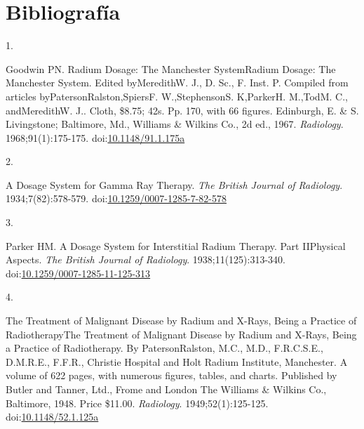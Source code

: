 \documentclass[
  a4paper,
]{scrreprt}
\newlength{\cslhangindent}
\newlength{\csllabelwidth}
\newlength{\cslentryspacingunit} %
\newenvironment{CSLReferences}[2] %
 {%
  \setlength{\parindent}{0pt}
  \ifodd #1
  \let\oldpar\par
  \def\par{\hangindent=\cslhangindent\oldpar}
  \fi
  \setlength{\parskip}{#2\cslentryspacingunit}
 }%
 {}
\newcommand{\CSLLeftMargin}[1]{\parbox[t]{\csllabelwidth}{#1}}
\newcommand{\CSLRightInline}[1]{\parbox[t]{\linewidth - \csllabelwidth}{#1}\break}
\begin{document}

\hypertarget{bibliografuxeda}{%
\chapter*{Bibliografía}\label{bibliografuxeda}}


\hypertarget{refs}{}
\begin{CSLReferences}{0}{0}
\leavevmode{}%
\CSLLeftMargin{1. }%
\CSLRightInline{Goodwin PN. Radium Dosage: The Manchester SystemRadium
Dosage: The Manchester System. Edited byMeredithW. J., D. Sc., F. Inst.
P. Compiled from articles byPatersonRalston,SpiersF. W.,StephensonS.
K,ParkerH. M.,TodM. C., andMeredithW. J.. Cloth, {\$}8.75; 42s. Pp. 170,
with 66 figures. Edinburgh, E. \& S. Livingstone; Baltimore, Md.,
Williams \& Wilkins Co., 2d ed., 1967. \emph{Radiology}.
1968;91(1):175-175.
doi:\href{https://doi.org/10.1148/91.1.175a}{10.1148/91.1.175a}}

\leavevmode{}%
\CSLLeftMargin{2. }%
\CSLRightInline{A Dosage System for Gamma Ray Therapy. \emph{The British
Journal of Radiology}. 1934;7(82):578-579.
doi:\href{https://doi.org/10.1259/0007-1285-7-82-578}{10.1259/0007-1285-7-82-578}}

\leavevmode{}%
\CSLLeftMargin{3. }%
\CSLRightInline{Parker HM. A Dosage System for Interstitial Radium
Therapy. Part II{\textemdash}Physical Aspects. \emph{The British Journal
of Radiology}. 1938;11(125):313-340.
doi:\href{https://doi.org/10.1259/0007-1285-11-125-313}{10.1259/0007-1285-11-125-313}}

\leavevmode{}%
\CSLLeftMargin{4. }%
\CSLRightInline{The Treatment of Malignant Disease by Radium and X-Rays,
Being a Practice of RadiotherapyThe Treatment of Malignant Disease by
Radium and X-Rays, Being a Practice of Radiotherapy. By PatersonRalston,
M.C., M.D., F.R.C.S.E., D.M.R.E., F.F.R., Christie Hospital and Holt
Radium Institute, Manchester. A volume of 622 pages, with numerous
figures, tables, and charts. Published by Butler and Tanner, Ltd., Frome
and London The Williams \& Wilkins Co., Baltimore, 1948. Price
{\$}11.00. \emph{Radiology}. 1949;52(1):125-125.
doi:\href{https://doi.org/10.1148/52.1.125a}{10.1148/52.1.125a}}


\end{CSLReferences}
\end{document}
